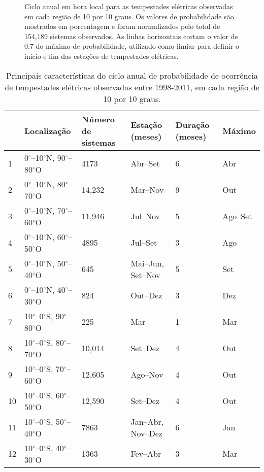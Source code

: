 \begin{figure}[!ht]
\caption{Ciclo anual em hora local para as tempestades elétricas observadas em cada região de 10 por 10 graus. Os valores de probabilidade são mostrados em porcentagem e foram normalizados pelo total de 154,189 sistemas observados. As linhas horizontais cortam o valor de 0.7 do máximo de probabilidade, utilizado como limiar para definir o início e fim das estações de tempestades elétricas.}
\label{anual}
\end{figure}


\begin{table}[!ht]
\caption{Principais características do ciclo anual de probabilidade de ocorrência de tempestades elétricas observadas entre 1998-2011, em cada região de 10 por 10 graus.}
\label{caracEstacao}
\centering
\small
\newcommand{\grayline}{\rowcolor[gray]{.88}}
\renewcommand {\tabularxcolumn }[1]{ >{\arraybackslash }m{#1}}
\begin{tabularx}{\textwidth}{p{0.6cm} p{3.5cm} W W W W} %
\hline\hline 
\grayline  & Localização & Número de sistemas & Estação (meses) & Duração (meses) & Máximo\\[1.5pt]
&0$^{\circ}$--10$^{\circ}$N, 90$^{\circ}$--80$^{\circ}$O& 4173  & Abr--Set &6& Abr\\[1.5pt]\grayline
2&0$^{\circ}$--10$^{\circ}$N, 80$^{\circ}$--70$^{\circ}$O& 14,232 & Mar--Nov &9& Out\\[1.5pt]
3&0$^{\circ}$--10$^{\circ}$N, 70$^{\circ}$--60$^{\circ}$O& 11,946 & Jul--Nov &5& Ago--Set\\[1.5pt]\grayline
4&0$^{\circ}$--10$^{\circ}$N, 60$^{\circ}$--50$^{\circ}$O&  4895 & Jul--Set &3& Ago\\[1.5pt]
5&0$^{\circ}$--10$^{\circ}$N, 50$^{\circ}$--40$^{\circ}$O& 645 & Mai--Jun, Set--Nov &5& Set\\[1.5pt] \grayline
6&0$^{\circ}$--10$^{\circ}$N, 40$^{\circ}$--30$^{\circ}$O& 824 & Out--Dez &3& Dez\\[1.5pt]

7&10$^{\circ}$--0$^{\circ}$S, 90$^{\circ}$--80$^{\circ}$O& 225 & Mar &1& Mar\\[1.5pt]\grayline
8&10$^{\circ}$--0$^{\circ}$S, 80$^{\circ}$--70$^{\circ}$O& 10,014 & Set--Dez &4& Out\\[1.5pt]
9&10$^{\circ}$--0$^{\circ}$S, 70$^{\circ}$--60$^{\circ}$O& 12,605 & Ago--Nov &4& Out\\[1.5pt]\grayline
10&10$^{\circ}$--0$^{\circ}$S, 60$^{\circ}$--50$^{\circ}$O& 12,590 & Set--Dez &4& Out\\[1.5pt]
11&10$^{\circ}$--0$^{\circ}$S, 50$^{\circ}$--40$^{\circ}$O& 7863 & Jan--Abr, Nov--Dez &6&  Jan\\[1.5pt]\grayline
12&10$^{\circ}$--0$^{\circ}$S, 40$^{\circ}$--30$^{\circ}$O& 1363 & Fev--Abr &3&  Mar\\[1.5pt]


\end{tabularx}
\end{table}
